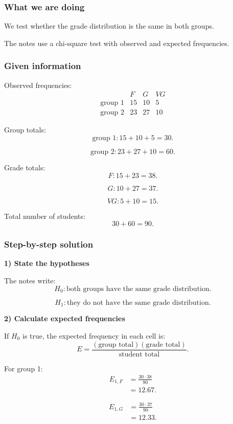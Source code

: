 \documentclass[10pt]{article}
\begin{document}
\subsubsection*{What we are doing}

We test whether the grade distribution is the same
in both groups.

The notes use a chi-square test with observed and
expected frequencies.

\subsubsection*{Given information}

Observed frequencies:
\[
\begin{array}{c|ccc}
& F & G & VG\\
\hline
\text{group 1} & 15 & 10 & 5\\
\text{group 2} & 23 & 27 & 10
\end{array}
\]

Group totals:
\[
\text{group 1}: 15+10+5=30.
\]

\[
\text{group 2}: 23+27+10=60.
\]

Grade totals:
\[
F:15+23=38.
\]

\[
G:10+27=37.
\]

\[
VG:5+10=15.
\]

Total number of students:
\[
30+60=90.
\]

\subsubsection*{Step-by-step solution}

\textbf{1) State the hypotheses}

The notes write:
\[
H_0:
\text{both groups have the same grade distribution.}
\]

\[
H_1:
\text{they do not have the same grade distribution.}
\]

\textbf{2) Calculate expected frequencies}

If \(H_0\) is true, the expected frequency in each
cell is:
\[
E=
\frac{
(\text{group total})(\text{grade total})
}{
\text{student total}
}.
\]

For group 1:
\begin{align*}
E_{1,F}
&=
\frac{30\cdot 38}{90}
\\[2mm]
&=12.67.
\end{align*}

\begin{align*}
E_{1,G}
&=
\frac{30\cdot 37}{90}
\\[2mm]
&=12.33.
\end{align*}
\end{document}
